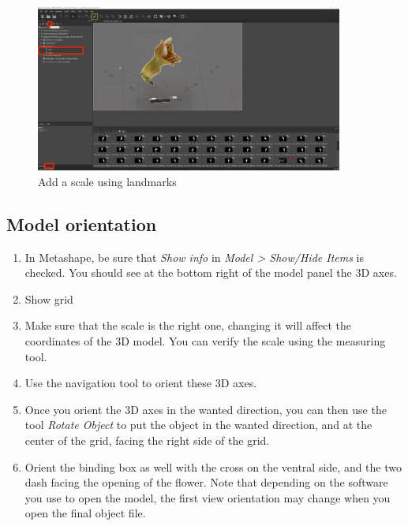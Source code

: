 \documentclass[10pt,letter,english]{article}
\begin{document}
\begin{figure}[H]
  \centering
  \includegraphics[width=0.9\textwidth]{Figures/metashape_add_scale_2.png}
  \caption{Add a scale using landmarks}
  \label{metashape_scale}
\end{figure}


\subsection{Model orientation}
    \begin{enumerate}
        \item In Metashape, be sure that \textit{Show info} in \textit{Model > Show/Hide Items} is checked. You should see at the bottom right of the model panel the 3D axes. 
        \item Show grid
        \item Make sure that the scale is the right one, changing it will affect the coordinates of the 3D model. You can verify the scale using the measuring tool. 
        \item Use the navigation tool to orient these 3D axes. 
        \item Once you orient the 3D axes in the wanted direction, you can then use the tool \textit{Rotate Object} to put the object in the wanted direction, and at the center of the grid, facing the right side of the grid.
        \item Orient the binding box as well with the cross on the ventral side, and the two dash facing the opening of the flower. Note that depending on the software you use to open the model, the first view orientation may change when you open the final object file.
    \end{enumerate}


\end{document}
